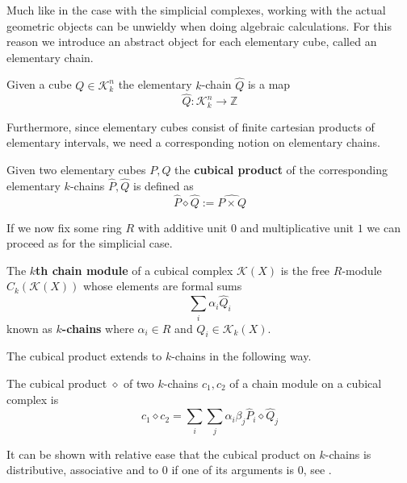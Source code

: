 \begin{example}
Much like in the case with the simplicial complexes, working with the actual geometric objects can be unwieldy when doing algebraic calculations. For this reason we introduce an abstract object for each elementary cube, called an elementary chain.
\begin{definition}
  Given a cube $Q \in \mathcal{K}^{n}_{k}$ the elementary $k$-chain $\hat Q$ is a map
  \[\hat Q: \mathcal{K}^{n}_{k} \to \mathbb{Z}\]
\end{definition}

Furthermore, since elementary cubes consist of finite cartesian products of elementary intervals, we need a corresponding notion on elementary chains.

\begin{definition}
Given two elementary cubes $P,Q$ the \textbf{cubical product} of the corresponding elementary $k$-chains $\hat P, \hat Q$ is defined as \[\hat P \diamond \hat Q:= \widehat{P \times Q}\]
\end{definition}
If we now fix some ring $R$ with additive unit $0$ and multiplicative unit $1$ we can proceed as for the simplicial case.
\begin{definition}
  The \textbf{$k$th chain module} of a cubical complex $\mathcal{K}(X)$ is the free $R$-module $C_{k}(\mathcal{K}(X))$ whose elements are formal sums
  \[ \sum_{i} \alpha_{i} \hat Q_{i}\]
  known as \textbf{$k$-chains} where $\alpha_{i} \in R$ and $Q_{i} \in \mathcal{K}_{k}(X)$.
\end{definition}

The cubical product extends to $k$-chains in the following way.

\begin{definition}
The cubical product $\diamond$ of two $k$-chains $c_{1},c_{2}$ of a chain module on a cubical complex is \[ c_{1} \diamond c_{2} = \sum_{i} \sum_{j} \alpha_{i} \beta_{j} \hat P_{i} \diamond  \hat Q_{j}\]
\end{definition}

It can be shown with relative ease that the cubical product on $k$-chains is distributive, associative and to 0 if one of its arguments is 0, see \cite[Proposition 2.25, p. ~51]{kaczynski2004}.


\end{example}
